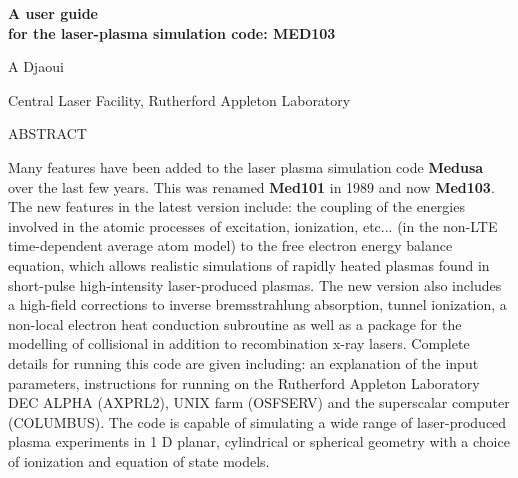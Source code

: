 \batchmode
{}
\setlength{\textheight}{9.5in}
\setlength{\textwidth}{6.5in}
\setlength{\topmargin}{-0.5in}
\setlength{\oddsidemargin}{0.0in}
\setlength{\evensidemargin}{0.0in}
\setlength{\parindent}{0.in}
 

\vspace{1.5in}
\begin{center}
{\Huge{\bf A user guide \\for the laser-plasma simulation code: MED103}}
\end{center}
\begin{center}
{\LARGE A Djaoui}
\end{center}
\begin{center}
{\Large Central Laser Facility, Rutherford Appleton Laboratory}
\end{center}
\vspace{1.5in}
\begin{center}
ABSTRACT
\end{center}


Many features have been added  to the
laser plasma simulation code {\bf Medusa} \cite{cpc} over the last few years. 
This was renamed {\bf Med101} \cite{med101} in 1989 and now {\bf Med103}.
The new features in the latest version include: 
the coupling of the energies involved  in the atomic processes of excitation, ionization, etc... 
(in the non-LTE time-dependent average atom model)  to the
free electron energy balance equation, which allows realistic
simulations of rapidly heated plasmas found in  short-pulse high-intensity
laser-produced plasmas. 
The new version also  includes
a high-field corrections to inverse bremsstrahlung absorption,
tunnel ionization, a non-local  electron heat conduction subroutine
as well as a package for the modelling of collisional  in addition to recombination x-ray lasers.
Complete details for running this
code are given including: an explanation of the
input parameters, instructions for running on the Rutherford
Appleton Laboratory DEC ALPHA (AXPRL2), UNIX farm (OSFSERV) and the 
superscalar computer (COLUMBUS).
The code is capable of simulating a wide range
of laser-produced plasma experiments in 1 D planar, cylindrical or spherical
geometry with a choice of ionization and equation of state models.
  


